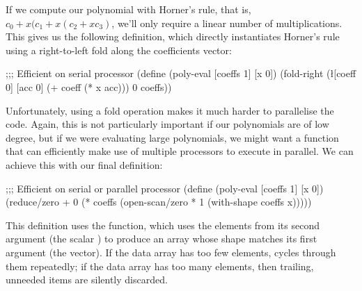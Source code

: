 If we compute our polynomial with Horner's rule,
that is, $c_0 + x (c_1 + x(c_2 + x c_3)$,
we'll only require a linear number of multiplications.
This gives us the following definition, 
which directly instantiates Horner's rule using a right-to-left fold
along the coefficients vector:
\begin{code}
;;; Efficient on serial processor
(define (poly-eval [coeffs 1] [x 0])
  (fold-right (\l{[coeff 0] [acc 0]} (+ coeff (* x acc)))
              0
              coeffs))\end{code}

Unfortunately, using a fold operation makes it much harder to
parallelise the code.
Again, this is not particularly important if our polynomials are of low degree,
but if we were evaluating large polynomials,
we might want a function that can efficiently make use of multiple
processors to execute in parallel.
We can achieve this with our final definition:
\begin{code}
;;; Efficient on serial or parallel processor
(define (poly-eval [coeffs 1] [x 0])
  (reduce/zero + 0
               (* coeffs
                  (open-scan/zero * 1 
                                  (with-shape coeffs x)))))\end{code}
This definition uses the  function,
which uses the elements from its second argument (the scalar )
to produce an array whose shape matches its first argument
(the  vector).
If the data array has too few elements,
 cycles through them repeatedly;
if the data array has too many elements,
then trailing, unneeded items are silently discarded.  

